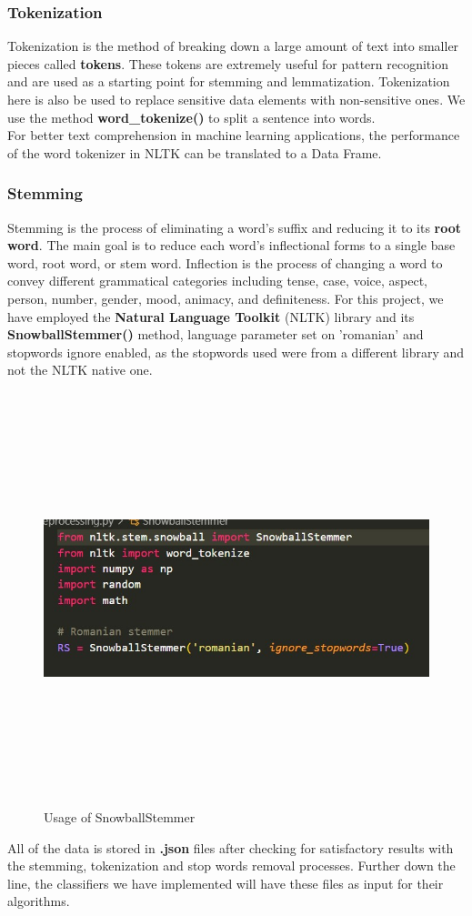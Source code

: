 \documentclass{article}
\begin{document}
	\subsubsection{Tokenization}
Tokenization is the method of breaking down a large amount of text into smaller pieces called \textbf{tokens}. These tokens are extremely useful for pattern recognition and are used as a starting point for stemming and lemmatization. Tokenization here is also be used to replace sensitive data elements with non-sensitive ones.
We use the method \textbf{word\_tokenize()} to split a sentence into words. \\
For better text comprehension in machine learning applications, the performance of the word tokenizer in NLTK can be translated to a Data Frame.
	\subsubsection{Stemming}
	Stemming is the process of eliminating a word's suffix and reducing it to its \textbf{root word}. The main goal is to reduce each word's inflectional forms to a single base word, root word, or stem word. Inflection is the process of changing a word to convey different grammatical categories including tense, case, voice, aspect, person, number, gender, mood, animacy, and definiteness.
	For this project, we have employed the \textbf{Natural Language Toolkit} (NLTK) library and its \textbf{SnowballStemmer()} method, language parameter set on 'romanian' and stopwords ignore enabled, as the stopwords used were from a different library and not the NLTK native one.
	\begin{figure}[!h]
		\centering
		\includegraphics[width=12cm,height=12cm,keepaspectratio]{Pics/NLTK screenshot}
		\caption{Usage of SnowballStemmer}
	\end{figure}
	All of the data is stored in \textbf{.json} files after checking for satisfactory results with the stemming, tokenization and stop words removal processes. Further down the line, the classifiers we have implemented will have these files as input for their algorithms. 
\end{document}
